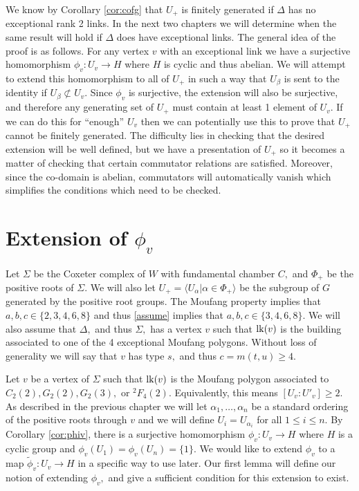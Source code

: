 \documentclass[class=book, crop=false,12 pt]{standalone}
\begin{document}
We know by Corollary \ref{cor:cofg} that $U_+$ is finitely generated if $\Delta$ has no exceptional rank 2 links. In the next two chapters we will determine when the same result will hold if $\Delta$ does have exceptional links. The general idea of the proof is as follows. For any vertex $v$ with an exceptional link we have a surjective homomorphism $\phi_v:U_v\to H$ where $H$ is cyclic and thus abelian. We will attempt to extend this homomorphism to all of $U_+$ in such a way that $U_\beta$ is sent to the identity if $U_\beta\not\subset U_v.$ Since $\phi_v$ is surjective, the extension will also be surjective, and therefore any generating set of $U_+$ must contain at least 1 element of $U_v.$ If we can do this for ``enough'' $U_v$ then we can potentially use this to prove that $U_+$ cannot be finitely generated. The difficulty lies in checking that the desired extension will be well defined, but we have a presentation of $U_+$ so it becomes a matter of checking that certain commutator relations are satisfied. Moreover, since the co-domain is abelian, commutators will automatically vanish which simplifies the conditions which need to be checked.

\section{Extension of $\phi_v$}
Let $\Sigma$ be the Coxeter complex of $W$ with fundamental chamber $C,$ and $\Phi_+$ be the positive roots of $\Sigma.$ We will also let $U_+=\langle U_\alpha|\alpha\in \Phi_+\rangle$ be the subgroup of $G$ generated by the positive root groups. The Moufang property implies that $a,b,c\in \{2,3,4,6,8\}$ and thus \eqref{assume} implies that $a,b,c\in \{3,4,6,8\}.$ We will also assume that $\Delta,$ and thus $\Sigma,$ has a vertex $v$ such that $\mathrm{lk}(v)$ is the building associated to one of the 4 exceptional Moufang polygons. Without loss of generality we will say that $v$ has type $s,$ and thus $c=m(t,u)\ge 4.$

Let $v$ be a vertex of $\Sigma$ such that $\mathrm{lk}(v)$ is the Moufang polygon associated to $C_2(2),G_2(2),G_2(3),$ or ${}^2F_4(2).$ Equivalently, this means $[U_v:U'_v]\ge 2.$ As described in the previous chapter we will let $\alpha_1,\dots,\alpha_n$ be a standard ordering of the positive roots through $v$ and we will define $U_i=U_{\alpha_i}$ for all $1\le i\le n.$ By Corollary \ref{cor:phiv}, there is a surjective homomorphism $\phi_v:U_v\to H$ where $H$ is a cyclic group and $\phi_v(U_1)=\phi_v(U_n)=\{1\}.$ We would like to extend $\phi_v$ to a map $\tilde{\phi}_v:U_v\to H$ in a specific way to use later. Our first lemma will define our notion of extending $\phi_v,$ and give a sufficient condition for this extension to exist.
\end{document}

